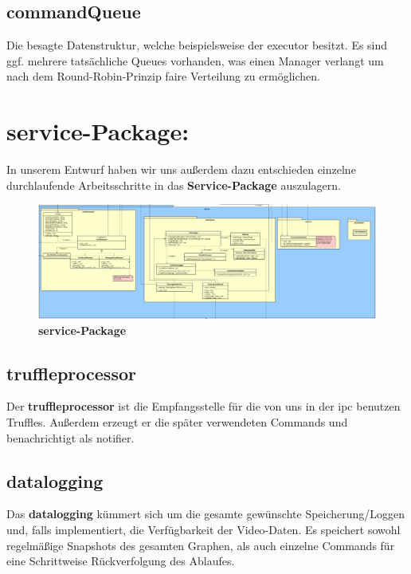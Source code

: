     \subsection*{\textbf{commandQueue}}
    Die besagte Datenstruktur, welche beispielsweise der executor besitzt. Es sind ggf. mehrere tatsächliche Queues vorhanden, was einen Manager verlangt um nach dem Round-Robin-Prinzip faire Verteilung zu ermöglichen.


\section{\textbf{service-Package:}}


In unserem Entwurf haben wir uns außerdem dazu entschieden einzelne durchlaufende Arbeitsschritte in das \textbf{Service-Package} auszulagern.\newline

\begin{figure}[H]
  \centering
  \includegraphics[width=\textwidth]{../diagramimages/service.png}
  \caption{\textbf{service-Package}}
  \medskip
\end{figure}

    \subsection*{\textbf{truffleprocessor}}
    Der \textbf{truffleprocessor} ist die Empfangsstelle für die von uns in der \gls{ipc} benutzen Truffles. Außerdem erzeugt er die später verwendeten Commands und benachrichtigt als \gls{notifier}.
    
    \subsection*{\textbf{datalogging}}
    Das \textbf{datalogging} kümmert sich um die gesamte gewünschte Speicherung/Loggen und, falls implementiert, die Verfügbarkeit der Video-Daten. Es speichert sowohl regelmäßige Snapshots des gesamten Graphen, als auch einzelne Commands für eine Schrittweise Rückverfolgung des Ablaufes.
    
